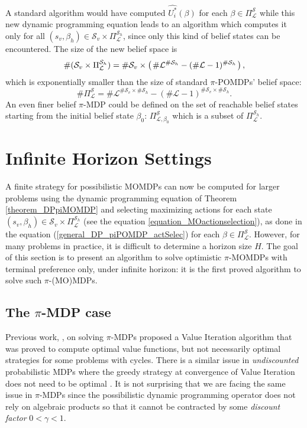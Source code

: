 A standard algorithm would have computed $\widehat{U_i^*}(\beta)$ for each
 $\beta \in \Pi^{\mathcal{S}}_{\mathcal{L}}$ 
while this new dynamic programming equation 
leads to an algorithm 
which computes it only 
for all $(s_v,\beta_h) \in \mathcal{S}_v \times 
\Pi^{\mathcal{S}_h}_{\mathcal{L}}$,
since only this kind of belief states can be encountered. 
The size of the new belief space is 
\[ \# (\mathcal{S}_v \times \Pi^{\mathcal{S}_h}_{\mathcal{L}})
= \# \mathcal{S}_v \times \left( \left.  \# \mathcal{L}^{\# \mathcal{S}_h} - (\# \mathcal{L}-1)^{\# \mathcal{S}_h}  \right. \right), \] 
which is exponentially smaller than the size of standard 
$\pi$-POMDPs' belief space: 
\[ \# \Pi^{\mathcal{S}}_{\mathcal{L}} = \# \mathcal{L}^{\# \mathcal{S}_v \times \# \mathcal{S}_h} - (\# \mathcal{L}-1)^{\# \mathcal{S}_v \times \# \mathcal{S}_h}. \]
An even finer belief $\pi$-MDP 
could be defined on the set of reachable belief states 
starting from the initial belief state $\beta_0$: 
$\Pi^{\mathcal{S}}_{\mathcal{L},\beta_0}$ which is a subset of 
$\Pi^{\mathcal{S}_h}_{\mathcal{L}}$. 

\section{Infinite Horizon Settings}
\label{section_infiniteHorizon}
A finite strategy for possibilistic MOMDPs can now be computed for
larger problems using the dynamic programming equation of Theorem \ref{theorem_DPpiMOMDP} 
and selecting maximizing actions for each state $(s_v,\beta_h) \in \mathcal{S}_v \times \Pi^{\mathcal{S}_h}_{\mathcal{L}}$
(see the equation \ref{equation_MOactionselection}), 
as done in the equation (\ref{general_DP_piPOMDP_actSelec}) 
for each $\beta \in \Pi^{\mathcal{S}}_{\mathcal{L}}$.
However, for many problems in practice, 
it is difficult to determine a horizon size $H$. 
The goal of this section is to present
an algorithm to solve optimistic $\pi$-MOMDPs with terminal preference only,
under infinite horizon:
it is the first proved algorithm to solve such $\pi$-(MO)MDPs.

\subsection{The $\pi$-MDP case}
\label{subsection_piVI}
Previous work, \cite{Sabbadin:1999:pipomdp,Sabbadin2001287}, 
on solving $\pi$-MDPs proposed a Value Iteration
algorithm that was proved to compute optimal value functions, but not
necessarily optimal strategies for some problems with cycles. 
There is a similar issue 
in \emph{undiscounted} probabilistic MDPs 
where the greedy strategy at convergence of Value Iteration 
does not need to be optimal \cite{puterman94}.
It is not surprising that we are facing the same issue in $\pi$-MDPs since the
possibilistic dynamic programming operator does not rely on algebraic products
so that it cannot be contracted by some \textit{discount factor} $0 < \gamma < 1$.


